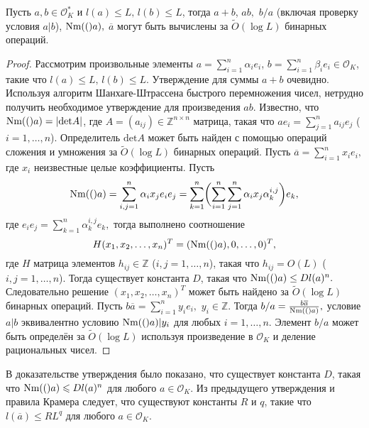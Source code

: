 \documentclass[_00_dissertation.tex]{subfiles}
\begin{document}
\begin{statement}\label{statement:operations}
    Пусть $a,b \in \mathcal{O}_K^*$ и $l(a)\leq L,\,l(b)\leq L$, тогда $a+b$, $ab,$ $b/a$ (включая проверку условия $a|b$), $\textrm{Nm}(()a),$ $\overline{a}$ могут быть  вычислены за $\tilde{O}(\log L)$ бинарных операций.
\end{statement}
\begin{proof}
    Рассмотрим произвольные элементы $a = \sum_{i = 1}^n \alpha_ie_i$, $b = \sum_{i = 1}^n \beta_i e_i \in \mathcal{O}_K$, такие что $l(a)\leq L,\,l(b)\leq L$.
    Утверждение для суммы $a+b$ очевидно.
    Используя алгоритм Шанхаге-Штрассена быстрого перемножения чисел, нетрудно получить необходимое утверждение для произведения $ab$.
    Известно, что $\textrm{Nm}(()a) = |\mathrm{det}A|$, где $A = (a_{ij}) \in \mathbb{Z}^{n \times n}$ матрица, такая что $a e_i = \sum_{j = 1}^n a_{ij}e_j$ ($i=1,\ldots,n$).
    Определитель $\mathrm{det} A$ может быть найден с помощью операций сложения и умножения за $\tilde{O}(\log L)$ бинарных операций.
    Пусть $\overline{a}=\sum_{i = 1}^n x_ie_i,$ где $x_i$ неизвестные целые коэффициенты.
    Пусть
    \begin{equation}
        \textrm{Nm}(()a)=\sum_{i,j=1}^n  \alpha_i x_j e_i e_j=\sum_{k=1}^n \biggl( \sum_{i = 1}^n\sum_{j = 1}^n \alpha_i x_j \alpha_k^{i,j}\biggr)e_k,
    \end{equation}
    где $e_ie_j=\sum_{k=1}^n \alpha_k^{i, j} e_k,$ тогда выполнено соотношение
    \begin{equation}
        H (x_1,x_2,\ldots, x_n)^T= (\textrm{Nm}(()a),0,\ldots,0)^T,
    \end{equation}
    где $H$ матрица элементов $h_{ij} \in \mathbb{Z}$ ($i,j = 1,\ldots,n$), такая что $h_{ij} = O(L)$ ($i,j = 1,\ldots,n$).
    Тогда существует константа $D$, такая что $\textrm{Nm}(()a)\le D l(a)^n.$
    Следовательно решение $(x_1,x_2,\ldots, x_n)^T$ может быть найдено за $\tilde{O}(\log L)$ бинарных операций.
    Пусть $b\overline{a}=\sum_{i=1}^n y_i e_i,$ $y_i \in \mathbb{Z}.$ Тогда $b/a=\frac{b\overline{a}}{\textrm{Nm}(()a)},$ условие $a|b$ эквивалентно условию $\textrm{Nm}(()a)|y_i$ для любых $i=1,\ldots,n.$ Элемент $b/a$ может быть определён за $\tilde{O}(\log L)$ используя произведение в $\mathcal{O}_K$ и деление рациональных чисел. 
\end{proof}

\begin{remark}
    В доказательстве утверждения было показано, что существует константа $D$, такая что $\textrm{Nm}(()a) \leqslant Dl(a)^n$ для любого $a \in \mathcal{O}_K$. Из предыдущего утверждения и правила Крамера следует, что существуют константы $R$ и $q$, такие что $l(\overline{a}) \leq RL^q$ для любого $a \in \mathcal{O}_K$.
\end{remark}
\end{document}
